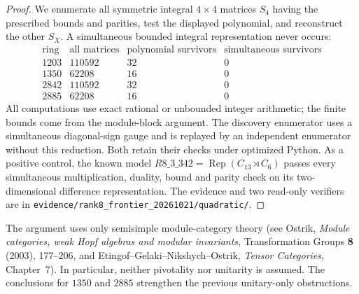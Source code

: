 \begin{proof}
We enumerate all symmetric integral $4\times4$ matrices $S_4$ having
the prescribed bounds and parities, test the displayed polynomial,
and reconstruct the other $S_X$.  A simultaneous bounded integral
representation never occurs:
\[
\begin{array}{c|r|r|r}
\text{ring}&\text{all matrices}&\text{polynomial survivors}&
\text{simultaneous survivors}\\\hline
1203&110592&32&0\\
1350&62208&16&0\\
2842&110592&32&0\\
2885&62208&16&0
\end{array}
\]
All computations use exact rational or unbounded integer arithmetic;
the finite bounds come from the module-block argument.  The discovery
enumerator uses a simultaneous diagonal-sign gauge and is replayed by
an independent enumerator without this reduction.  Both retain their
checks under optimized Python.  As a positive control, the known
model $R8\_3\_342=\operatorname{Rep}(C_{13}\rtimes C_6)$ passes every
simultaneous multiplication, duality, bound and parity check on its
two-dimensional difference representation.  The evidence and two
read-only verifiers are in
\texttt{evidence/rank8\_frontier\_20261021/quadratic/}.
\end{proof}

The argument uses only semisimple module-category theory (see Ostrik,
\emph{Module categories, weak Hopf algebras and modular invariants},
Transformation Groups \textbf{8} (2003), 177--206, and
Etingof--Gelaki--Nikshych--Ostrik, \emph{Tensor Categories}, Chapter~7).
In particular, neither pivotality nor unitarity is assumed.  The
conclusions for $1350$ and $2885$ strengthen the previous unitary-only
obstructions.

